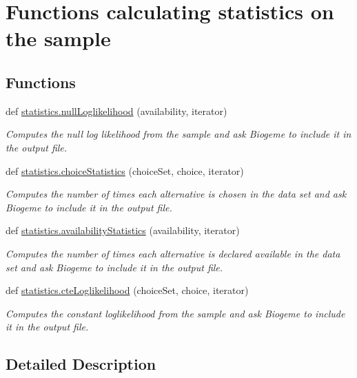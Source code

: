 \hypertarget{group__stats}{}\section{Functions calculating statistics on the sample}
\label{group__stats}
\subsection*{Functions}
\begin{DoxyCompactItemize}
\item 
def \hyperlink{group__stats_gad835cf7d8238366c55cf50498b7e84c3}{statistics.\+null\+Loglikelihood} (availability, iterator)
\begin{DoxyCompactList}\small\item\em Computes the null log likelihood from the sample and ask Biogeme to include it in the output file. \end{DoxyCompactList}\item 
def \hyperlink{group__stats_gabfe5347e76156feff2601f69a602e576}{statistics.\+choice\+Statistics} (choice\+Set, choice, iterator)
\begin{DoxyCompactList}\small\item\em Computes the number of times each alternative is chosen in the data set and ask Biogeme to include it in the output file. \end{DoxyCompactList}\item 
def \hyperlink{group__stats_ga314ae0f380b27de667e17b638355ec3d}{statistics.\+availability\+Statistics} (availability, iterator)
\begin{DoxyCompactList}\small\item\em Computes the number of times each alternative is declared available in the data set and ask Biogeme to include it in the output file. \end{DoxyCompactList}\item 
def \hyperlink{group__stats_ga0c4141fb56233c42e293bc5986d865e6}{statistics.\+cte\+Loglikelihood} (choice\+Set, choice, iterator)
\begin{DoxyCompactList}\small\item\em Computes the constant loglikelihood from the sample and ask Biogeme to include it in the output file. \end{DoxyCompactList}\end{DoxyCompactItemize}


\subsection{Detailed Description}


